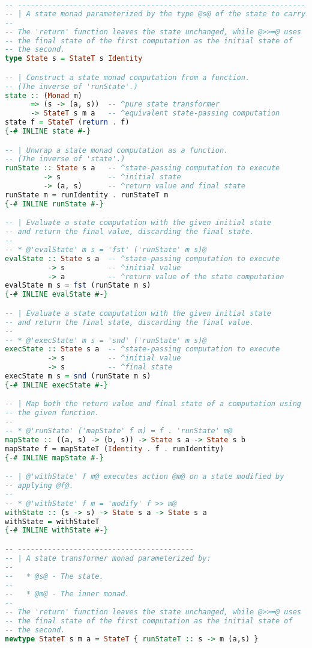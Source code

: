 \begin{lstlisting}[language=Haskell]
-- -------------------------------------------------------------------
-- | A state monad parameterized by the type @s@ of the state to carry.
--
-- The 'return' function leaves the state unchanged, while @>>=@ uses
-- the final state of the first computation as the initial state of
-- the second.
type State s = StateT s Identity

-- | Construct a state monad computation from a function.
-- (The inverse of 'runState'.)
state :: (Monad m)
      => (s -> (a, s))  -- ^pure state transformer
      -> StateT s m a   -- ^equivalent state-passing computation
state f = StateT (return . f)
{-# INLINE state #-}

-- | Unwrap a state monad computation as a function.
-- (The inverse of 'state'.)
runState :: State s a   -- ^state-passing computation to execute
         -> s           -- ^initial state
         -> (a, s)      -- ^return value and final state
runState m = runIdentity . runStateT m
{-# INLINE runState #-}

-- | Evaluate a state computation with the given initial state
-- and return the final value, discarding the final state.
--
-- * @'evalState' m s = 'fst' ('runState' m s)@
evalState :: State s a  -- ^state-passing computation to execute
          -> s          -- ^initial value
          -> a          -- ^return value of the state computation
evalState m s = fst (runState m s)
{-# INLINE evalState #-}

-- | Evaluate a state computation with the given initial state
-- and return the final state, discarding the final value.
--
-- * @'execState' m s = 'snd' ('runState' m s)@
execState :: State s a  -- ^state-passing computation to execute
          -> s          -- ^initial value
          -> s          -- ^final state
execState m s = snd (runState m s)
{-# INLINE execState #-}

-- | Map both the return value and final state of a computation using
-- the given function.
--
-- * @'runState' ('mapState' f m) = f . 'runState' m@
mapState :: ((a, s) -> (b, s)) -> State s a -> State s b
mapState f = mapStateT (Identity . f . runIdentity)
{-# INLINE mapState #-}

-- | @'withState' f m@ executes action @m@ on a state modified by
-- applying @f@.
--
-- * @'withState' f m = 'modify' f >> m@
withState :: (s -> s) -> State s a -> State s a
withState = withStateT
{-# INLINE withState #-}

-- -----------------------------------------
-- | A state transformer monad parameterized by:
--
--   * @s@ - The state.
--
--   * @m@ - The inner monad.
--
-- The 'return' function leaves the state unchanged, while @>>=@ uses
-- the final state of the first computation as the initial state of
-- the second.
newtype StateT s m a = StateT { runStateT :: s -> m (a,s) }


\end{lstlisting}
